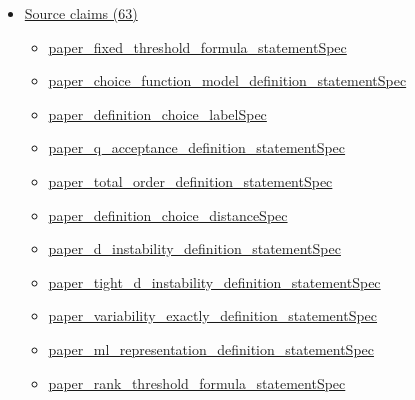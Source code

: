 \documentclass[10pt]{article}
\begin{document}
\begin{itemize}[leftmargin=1.2em]
\begin{itemize}[leftmargin=1.2em]
\item \hyperlink{library-prerequisite-542d5eef4a694a7d}{EconCSLib.FiniteChoice.Substitutable}
\item \hyperlink{library-prerequisite-bb61a90095edae4b}{EconCSLib.FiniteChoice.TightlyDUnstable}
\item \hyperlink{library-prerequisite-aa69285c37fbf372}{EconCSLib.FiniteChoice.VariabilityAtMost}
\item \hyperlink{library-prerequisite-4ccdc8565ec23c71}{EconCSLib.FiniteChoice.VariabilityExactly}
\item \hyperlink{library-prerequisite-e55d0830fae724cb}{EconCSLib.FiniteChoice.ZeroUnstable}
\item \hyperlink{library-prerequisite-4a3989697f894599}{EconCSLib.FiniteChoice.linearTopQChoice}
\item \hyperlink{library-prerequisite-3767c56c4f2cc69a}{EconCSLib.FiniteChoice.sequentialComposition}
\end{itemize}
\item \hyperlink{source-section-f10b5f68e4acf3dc}{Source claims (63)}
\begin{itemize}[leftmargin=1.2em]
\item \hyperlink{source-claim-03de8677e0f95903}{paper\_fixed\_threshold\_formula\_statementSpec}
\item \hyperlink{source-claim-685dcba90250bf7c}{paper\_choice\_function\_model\_definition\_statementSpec}
\item \hyperlink{source-claim-d396bf72ee1812a2}{paper\_definition\_choice\_labelSpec}
\item \hyperlink{source-claim-51b92e4a229b02a5}{paper\_q\_acceptance\_definition\_statementSpec}
\item \hyperlink{source-claim-9a3be13c89f94ffe}{paper\_total\_order\_definition\_statementSpec}
\item \hyperlink{source-claim-a21144374ad8e28c}{paper\_definition\_choice\_distanceSpec}
\item \hyperlink{source-claim-398a4d87fcced6ba}{paper\_d\_instability\_definition\_statementSpec}
\item \hyperlink{source-claim-62d00d89c6cc151a}{paper\_tight\_d\_instability\_definition\_statementSpec}
\item \hyperlink{source-claim-be4f0b5bb7e1dd6b}{paper\_variability\_exactly\_definition\_statementSpec}
\item \hyperlink{source-claim-12cc974d07b19ac2}{paper\_ml\_representation\_definition\_statementSpec}
\item \hyperlink{source-claim-1e70e813c2db1d8e}{paper\_rank\_threshold\_formula\_statementSpec}

\end{itemize}
\end{itemize}
\end{document}
